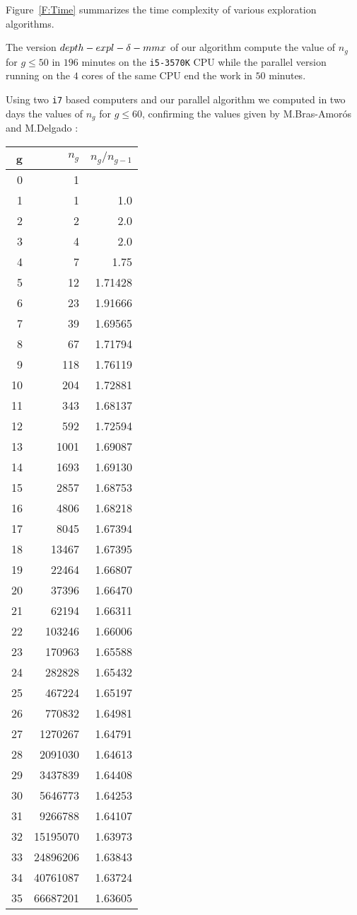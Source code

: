 \documentclass[reqno,11pt]{amsart}
\theoremstyle{plain}
\theoremstyle{definition}
\renewcommand{\leq}{\leqslant}
\renewcommand{\tt}[1]{\texttt{#1}}
\begin{document}
Figure~\ref{F:Time} summarizes the time complexity of various exploration algorithms.

The version $\small depth-expl-\delta-mmx$ of our algorithm compute the value of $n_g$ for $g\leq 50$ in $196$ minutes on the \tt{i5-3570K} CPU while the parallel version running on the $4$ cores of the same CPU end the work in $50$ minutes.

Using two \tt{i7} based computers and our  parallel algorithm  we computed in two days the values of $n_g$ for $g\leq 60$, confirming the values given by M.Bras-Amor\'os and M.Delgado : 

\begin{minipage}{0.5\textwidth}
\begin{tabular}{|r|r|r|}
\hline
g & $n_g$ & $n_g/n_{g-1}$\\
\hline
0 & 1 &  \\
1 & 1 & 1.0 \\
2 & 2 & 2.0 \\
3 & 4 & 2.0 \\
4 & 7 & 1.75 \\
5 & 12 & 1.71428 \\
6 & 23 & 1.91666 \\
7 & 39 & 1.69565 \\
8 & 67 & 1.71794 \\
9 & 118 & 1.76119 \\
10 & 204 & 1.72881 \\
11 & 343 & 1.68137 \\
12 & 592 & 1.72594 \\
13 & 1001 & 1.69087 \\
14 & 1693 & 1.69130 \\
15 & 2857 & 1.68753 \\
16 & 4806 & 1.68218 \\
17 & 8045 & 1.67394 \\
18 & 13467 & 1.67395 \\
19 & 22464 & 1.66807 \\
20 & 37396 & 1.66470 \\
21 & 62194 & 1.66311 \\
22 & 103246 & 1.66006 \\
23 & 170963 & 1.65588 \\
24 & 282828 & 1.65432 \\
25 & 467224 & 1.65197 \\
26 & 770832 & 1.64981 \\
27 & 1270267 & 1.64791 \\
28 & 2091030 & 1.64613 \\
29 & 3437839 & 1.64408 \\
30 & 5646773 & 1.64253 \\
31 & 9266788 & 1.64107 \\
32 & 15195070 & 1.63973 \\
33 & 24896206 & 1.63843 \\
34 & 40761087 & 1.63724 \\
35 & 66687201 & 1.63605 \\
\hline
\end{tabular}
\end{minipage}
\end{document}
